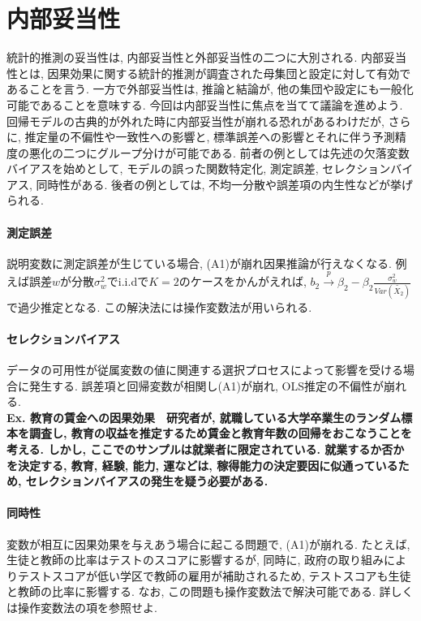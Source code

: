 \documentclass[paper=a4paper,fontsize=10pt]{jlreq}
\begin{document}
\section{内部妥当性} 
統計的推測の妥当性は, 内部妥当性と外部妥当性の二つに大別される. 内部妥当性とは, 因果効果に関する統計的推測が調査された母集団と設定に対して有効であることを言う. 一方で外部妥当性は, 推論と結論が, 他の集団や設定にも一般化可能であることを意味する. 今回は内部妥当性に焦点を当てて議論を進めよう. 回帰モデルの古典的が外れた時に内部妥当性が崩れる恐れがあるわけだが, さらに, 推定量の不偏性や一致性への影響と, 標準誤差への影響とそれに伴う予測精度の悪化の二つにグループ分けが可能である. 前者の例としては先述の欠落変数バイアスを始めとして, モデルの誤った関数特定化, 測定誤差, セレクションバイアス, 同時性がある. 後者の例としては, 不均一分散や誤差項の内生性などが挙げられる.\\

\paragraph{測定誤差}
説明変数に測定誤差が生じている場合, (A1)が崩れ因果推論が行えなくなる. 例えば誤差$w$が分散$\sigma_w^2$でi.i.dで$K=2$のケースをかんがえれば, $b_2 \overset{p}{\to} \beta_2 - \beta_2\frac{\sigma_w^2}{Var(\tilde{X_2})}$ で過少推定となる. この解決法には操作変数法が用いられる. \\

\paragraph{セレクションバイアス}
データの可用性が従属変数の値に関連する選択プロセスによって影響を受ける場合に発生する. 誤差項と回帰変数が相関し(A1)が崩れ, OLS推定の不偏性が崩れる.\\

\rmfamily\mcfamily\bfseries{Ex. 教育の賃金への因果効果}\mdseries　研究者が, 就職している大学卒業生のランダム標本を調査し, 教育の収益を推定するため賃金と教育年数の回帰をおこなうことを考える. しかし, ここでのサンプルは就業者に限定されている. 就業するか否かを決定する, 教育, 経験, 能力, 運などは, 稼得能力の決定要因に似通っているため, セレクションバイアスの発生を疑う必要がある.\\

\paragraph{同時性}
変数が相互に因果効果を与えあう場合に起こる問題で, (A1)が崩れる. 
たとえば, 生徒と教師の比率はテストのスコアに影響するが, 同時に, 政府の取り組みによりテストスコアが低い学区で教師の雇用が補助されるため, テストスコアも生徒と教師の比率に影響する. なお, この問題も操作変数法で解決可能である. 詳しくは操作変数法の項を参照せよ.\\
\end{document}
